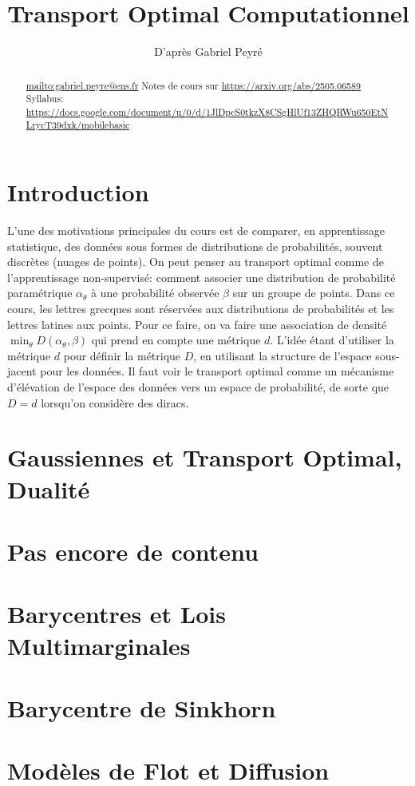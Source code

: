 \documentclass[info, math, french]{mpb-cours}
\title{Transport Optimal Computationnel}
\author{D'après Gabriel Peyré}
\begin{document}
\bettertitle
\begin{abstract}
	\url{mailto:gabriel.peyre@ens.fr}
	Notes de cours sur \url{https://arxiv.org/abs/2505.06589}
	Syllabus: \url{https://docs.google.com/document/u/0/d/1JlDpcS0tkzX8CSgHlUf13ZHQRWu650EtNLrycT39dxk/mobilebasic}
\end{abstract}

\section*{Introduction}
L'une des motivations principales du cours est de comparer, en apprentissage statistique,
des données sous formes de distributions de probabilités, souvent discrètes (nuages de points).
On peut penser au transport optimal comme de l'apprentissage non-supervisé: comment associer une
distribution de probabilité paramétrique $\alpha_{\theta}$ à une probabilité observée $\beta$ sur un groupe de points.
Dans ce cours, les lettres grecques sont réservées aux distributions de probabilités et les lettres latines
aux points.
Pour ce faire, on va faire une association de densité $\min_{\theta} D(\alpha_{\theta}, \beta)$ qui
prend en compte une métrique $d$.
L'idée étant d'utiliser la métrique $d$ pour définir la métrique $D$, en utilisant la structure
de l'espace sous-jacent pour les données.
Il faut voir le transport optimal comme un mécanisme d'élévation de l'espace des données vers un espace
de probabilité, de sorte que $D = d$ lorsqu'on considère des diracs.







\section{Gaussiennes et Transport Optimal, Dualité}

\section{Pas encore de contenu}

\section{Barycentres et Lois Multimarginales}

\section{Barycentre de Sinkhorn}

\section{Modèles de Flot et Diffusion}
\end{document}
